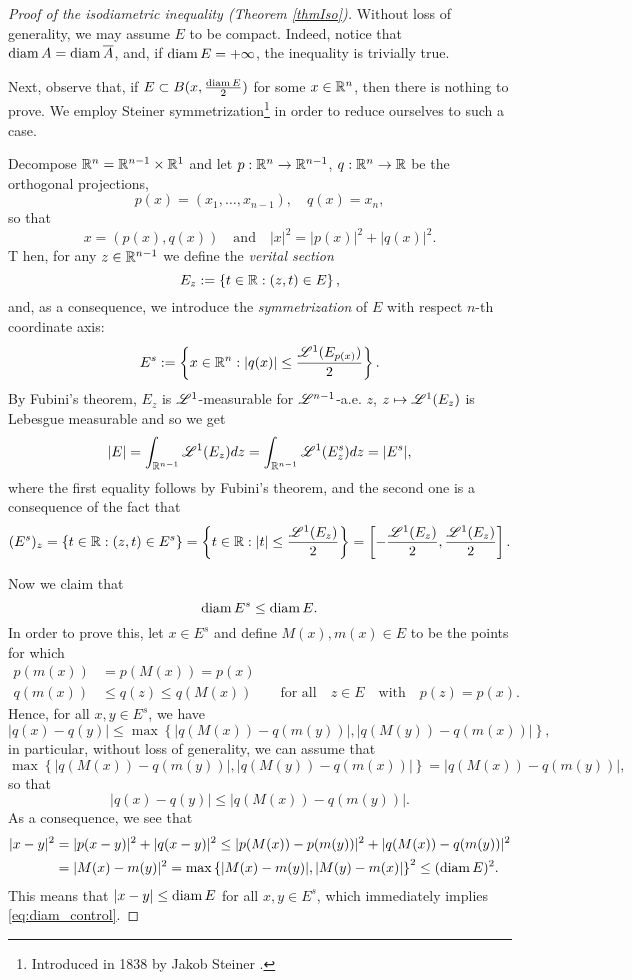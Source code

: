 \begin{proof}[Proof of the isodiametric inequality (Theorem \ref{thmIso})]
Without loss of generality, we may assume $E$ to be compact. Indeed, notice that $\operatorname{diam} A = \operatorname{diam} \overline{A}$, and, if $\operatorname{diam} E = + \infty$, the inequality is trivially true.

Next, observe that, if $E \subset B(x, \frac{\operatorname{diam} E}{2})$ for some $x \in \mathbb{R}^{n}$, then there is nothing to prove. We employ Steiner symmetrization\footnote{Introduced in 1838 by Jakob Steiner \cite{steiner1838einfache}.} in order to reduce ourselves to such a case.

Decompose $\mathbb{R}^n = \mathbb{R}^{n-1}\times \mathbb{R}^1$ and let $p
: \mathbb{R}^n \to \mathbb{R}^{n-1}$, $q: \mathbb{R}^n \to \mathbb{R}$ be the orthogonal projections, $$p(x) = (x_{1}, \dots, x_{n - 1}), \quad q(x) =x_{n},$$ so that $$x = (p(x), q(x)) \quad \text{and} \quad |x|^2 = |p(x)|^2 + |q(x)|^2.$$ T
hen, for any $z \in \mathbb{R}^{n - 1}$ we define the {\em verital section}
\[
 E_z := \left\{t\in\mathbb{R} : (z,t) \in E\right\},
\]
and, as a consequence, we introduce the {\em symmetrization} of $E$ with respect $n$-th coordinate axis:
\[
E^s := \left\{ x \in \mathbb{R}^n: |q(x)| \leq \frac{\mathscr{L}^{1}(E_{p(x)})}{2}\right\}.
\]
By Fubini's theorem, $E_z$ is $\mathscr{L}^{1}$-measurable for
$\mathscr{L}^{n-1}$-a.e. $z$, $z \mapsto \mathscr{L}^{1}(E_z)$ is Lebesgue
measurable and so we get
\begin{equation} \label{eq:Lebesgue_symm_equality}
|E| = \int_{\mathbb{R}^{n-1}} \mathscr{L}^{1}(E_z) dz = \int_{\mathbb{R}^{n-1}}
\mathscr{L}^{1}(E_z^s) dz = |E^s|,
\end{equation}
where the first equality follows by Fubini's theorem, and the second one is a consequence of the fact that
\[
(E^s)_z = \{ t\in\mathbb{R} : (z,t) \in E^s \}
= \left\{ t\in \mathbb{R} : |t| \leq \frac{\mathscr{L}^{1}(E_z)}{2} \right\}
= \left[ - \frac{\mathscr{L}^{1}(E_z)}{2}, \frac{\mathscr{L}^{1}(E_z)}{2} \right].
\]

Now we claim that
\begin{equation} \label{eq:diam_control}
\operatorname{diam} E^s \leq \operatorname{diam} E.
\end{equation}
In order to prove this, let $x \in E^s$ and define $M(x), m(x)
\in E$ to be the points for which 
\[
\begin{aligned}
p(m(x)) &= p(M(x)) = p(x)
\\
q(m(x)) &\le q(z) \leq q(M(x))
\qquad \text{for all} \quad z \in E \quad \text{with} \quad p(z) = p(x).
\end{aligned}
\]
Hence, for all $x,y \in E^s$, we have
\[
|q(x) - q(y)| \leq \max \left\{|q(M(x)) - q(m(y))|, |q(M(y)) - q(m(x))|\right\},
\]
in particular, without loss of generality, we can assume that
$$\max \left\{|q(M(x)) - q(m(y))|, |q(M(y)) - q(m(x))|\right\} = |q(M(x)) - q(m(y))|,$$
so that
$$ |q(x) - q(y)| \leq |q(M(x)) - q(m(y))|.$$
As a consequence, we see that
\begin{align*}
|x-y|^2 & = |p(x-y)|^2 + |q(x-y)|^2 \leq |p(M(x)) - p(m(y))|^2 + |q(M(x)) - q(m(y))|^2 \\
& = |M(x) - m(y)|^2 = \max \left\{|M(x) - m(y)|, |M(y) -
m(x)|\right\}^2
\leq (\operatorname{diam} E)^2 .
\end{align*}
This means that $|x - y| \leq \operatorname{diam} E$ for all $x,y \in E^s$, which immediately implies \eqref{eq:diam_control}.


\end{proof}
